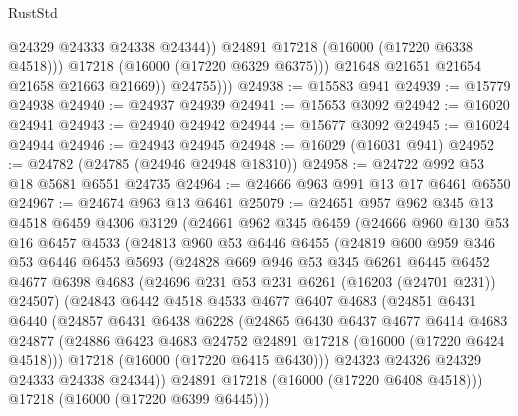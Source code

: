 \begin{lexlean}{RustStd}
\begin{coremodule}
                      @24329
                      @24333
                      @24338
                      @24344))
                  @24891
                  @17218
                  (@16000 (@17220 @6338 @4518)))
                @17218
                (@16000 (@17220 @6329 @6375)))
              @21648
              @21651
              @21654
              @21658
              @21663
              @21669))
          @24755)))
@24938 := @15583 @941
@24939 := @15779 @24938
@24940 := @24937 @24939
@24941 := @15653 @3092
@24942 := @16020 @24941
@24943 := @24940 @24942
@24944 := @15677 @3092
@24945 := @16024 @24944
@24946 := @24943 @24945
@24948 := @16029 (@16031 @941)
@24952 := @24782 (@24785 (@24946 @24948 @18310))
@24958 := @24722 @992 @53 @18 @5681 @6551 @24735
@24964 := @24666 @963 @991 @13 @17 @6461 @6550
@24967 := @24674 @963 @13 @6461
@25079 := @24651
    @957
    @962
    @345
    @13
    @4518
    @6459
    @4306
    @3129
    (@24661
      @962
      @345
      @6459
      (@24666
        @960
        @130
        @53
        @16
        @6457
        @4533
        (@24813
          @960
          @53
          @6446
          @6455
          (@24819
            @600
            @959
            @346
            @53
            @6446
            @6453
            @5693
            (@24828
              @669
              @946
              @53
              @345
              @6261
              @6445
              @6452
              @4677
              @6398
              @4683
              (@24696 @231 @53 @231 @6261 (@16203 (@24701 @231)) @24507)
              (@24843
                @6442
                @4518
                @4533
                @4677
                @6407
                @4683
                (@24851
                  @6431
                  @6440
                  (@24857
                    @6431
                    @6438
                    @6228
                    (@24865
                      @6430
                      @6437
                      @4677
                      @6414
                      @4683
                      @24877
                      (@24886 @6423 @4683 @24752 @24891 @17218 (@16000 (@17220 @6424 @4518)))
                      @17218
                      (@16000 (@17220 @6415 @6430)))
                    @24323
                    @24326
                    @24329
                    @24333
                    @24338
                    @24344))
                @24891
                @17218
                (@16000 (@17220 @6408 @4518)))
              @17218
              (@16000 (@17220 @6399 @6445)))

\end{coremodule}
\end{lexlean}
